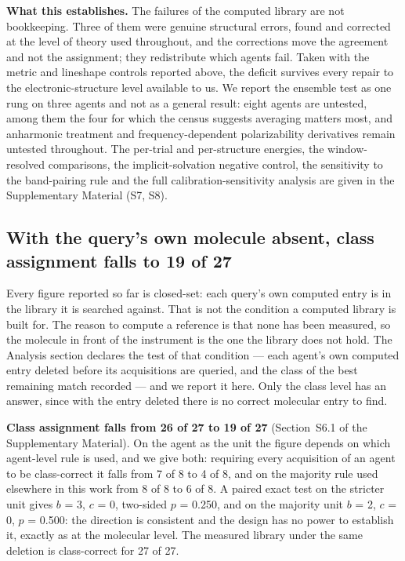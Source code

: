 \documentclass[review,12pt]{elsarticle}
\begin{document}
\textbf{What this establishes.} The failures of the computed library are not bookkeeping.
Three of them were genuine structural errors, found and corrected at the level of theory
used throughout, and the corrections move the agreement and not the assignment; they
redistribute which agents fail. Taken with the metric and lineshape controls reported
above, the deficit survives every repair to the electronic-structure level available to us.
We report the ensemble test as one rung on three agents and not as a general result: eight
agents are untested, among them the four for which the census suggests averaging matters
most, and anharmonic treatment and frequency-dependent polarizability derivatives remain
untested throughout. The per-trial and per-structure energies, the window-resolved
comparisons, the implicit-solvation negative control, the sensitivity to the band-pairing
rule and the full calibration-sensitivity analysis are given in the Supplementary Material
(S7, S8).

\subsection{With the query's own molecule absent, class assignment falls to 19 of 27}
\label{sec:lomo}

Every figure reported so far is closed-set: each query's own computed entry is in the
library it is searched against. That is not the condition a computed library is built for.
The reason to compute a reference is that none has been measured, so the molecule in front
of the instrument is the one the library does not hold. The Analysis section declares
the test of that condition --- each agent's own computed entry deleted before its
acquisitions are queried, and the class of the best remaining match recorded --- and we
report it here. Only the class level has an answer, since with the entry deleted there is
no correct molecular entry to find.

\textbf{Class assignment falls from 26 of 27 to 19 of 27} (Section~S6.1 of the
Supplementary Material). On the agent as the unit the figure depends on which agent-level
rule is used, and we give both: requiring every acquisition of an agent to be class-correct
it falls from 7 of 8 to 4 of 8, and on the majority rule used elsewhere in this work from 8
of 8 to 6 of 8. A paired exact test on the stricter unit gives $b$ = 3, $c$ = 0, two-sided
$p$ = 0.250, and on the majority unit $b$ = 2, $c$ = 0, $p$ = 0.500: the direction is
consistent and the design has no power to establish it, exactly as at the molecular level.
The measured library under the same deletion is class-correct for 27 of 27.
\end{document}

